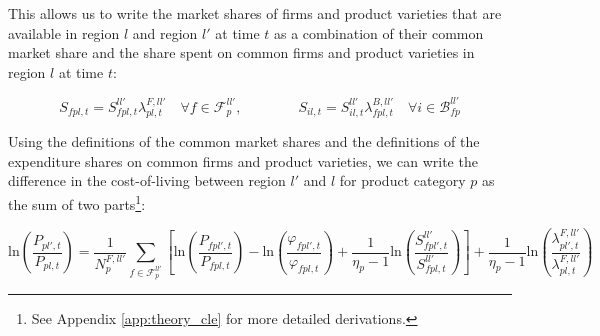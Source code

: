 \noindent This allows us to write the market shares of firms and product varieties that are available in region $l$ and region $l'$ at time $t$ as a combination of their common market share and the share spent on common firms and product varieties in region $l$ at time $t$: 
\begin{linenomath*}
    \begin{equation*}
        S_{fpl,t} = S^{ll'}_{fpl,t} \lambda^{F,ll'}_{pl,t}
            \quad \forall f \in \mathcal{F}^{ll'}_{p}, \qquad \qquad 
        S_{il,t}  = S^{ll'}_{il,t} \lambda^{B,ll'}_{fpl,t}
            \quad \forall i \in \mathcal{B}^{ll'}_{fp}
    \end{equation*}
\end{linenomath*}

Using the definitions of the common market shares and the definitions of the expenditure shares on common firms and product varieties, we can write the difference in the cost-of-living between region $l'$ and $l$ for product category $p$ as the sum of two parts\footnote{See Appendix \ref{app:theory_cle} for more detailed derivations.}: 
\begin{linenomath*}
    \begin{equation}\label{eq:cle_decomp}
        \text{ln}\left(\frac{P_{pl',t}}{P_{pl,t}}\right)
            =   \frac{1}{N^{F,ll'}_{p}}
                \sum_{f \in \mathcal{F}^{ll'}_{p}} 
                \left[
                    \text{ln}\left(\frac{P_{fpl',t}}{P_{fpl,t}}\right)
                        -   \text{ln}\left(\frac{\varphi_{fpl',t}}{\varphi_{fpl,t}}\right)
                        +   \frac{1}{\eta_p-1}\text{ln}
                            \left(
                                \frac{S^{ll'}_{fpl',t}}{S^{ll'}_{fpl,t}}
                            \right)
                \right]
                + \frac{1}{\eta_p-1}
                    \text{ln}
                    \left(
                        \frac{\lambda^{F,ll'}_{pl',t}}{\lambda^{F,ll'}_{pl,t}}
                    \right)
    \end{equation}
\end{linenomath*}
